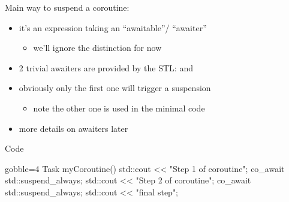 \begin{frame}[fragile]
  \begin{block}{Main way to suspend a coroutine: }
    \begin{itemize}
    \item it's an expression taking an ``awaitable''/ ``awaiter''
      \begin{itemize}
      \item we'll ignore the distinction for now
      \end{itemize}
    \item 2 trivial awaiters are provided by the STL:  and 
    \item obviously only the first one will trigger a suspension
      \begin{itemize}
      \item note the other one is used in the minimal code
      \end{itemize}
    \item more details on awaiters later
    \end{itemize}
  \end{block}
  \begin{exampleblock}{Code}
    {\scriptsize
      \begin{cppcode*}{gobble=4}
        Task myCoroutine() {
          std::cout << "Step 1 of coroutine\n";
          co_await std::suspend_always{};
          std::cout << "Step 2 of coroutine\n";
          co_await std::suspend_always{};
          std::cout << "final step\n";
        }
      \end{cppcode*}
    }
  \end{exampleblock}
\end{frame}

